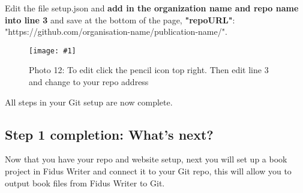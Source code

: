 \documentclass{article}
\newlength{\imgwidth}
\newcommand\scaledgraphics[2]{%
                
\settowidth{\imgwidth}{\texttt{[image: \#1]}}%
                
\setlength{\imgwidth}{\minof{\imgwidth}{#2\textwidth}}%
                
\texttt{[image: \#1]}%
                
}
\begin{document}
Edit the file setup.json and \textbf{add in the organization name and repo name into line 3} and save at the bottom of the page, \textbf{"repoURL"}: "https://github.com/organisation-name/publication-name/".

\begin{figure}
\scaledgraphics{8e9e4c18-b941-4173-b655-fe716a42a060.png}{1}
\caption*{Photo 12: To edit click the pencil icon top right. Then edit line 3 and change to your repo address}\label{F45407401}
\end{figure}


All steps in your Git setup are now complete.


\subsection{Step 1 completion: What's next?}\label{H4342812}



Now that you have your repo and website setup, next you will set up a book project in Fidus Writer and connect it to your Git repo, this will allow you to output book files from Fidus Writer to Git.
\end{document}
